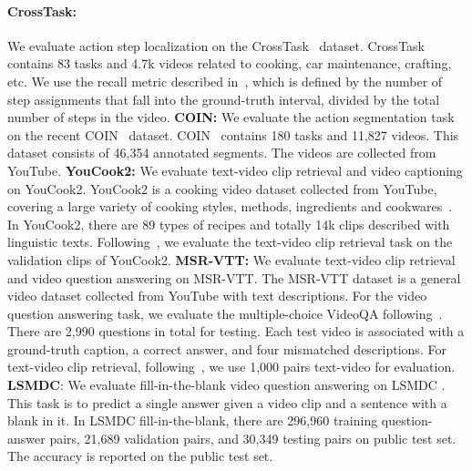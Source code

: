 \documentclass[10pt,twocolumn,letterpaper]{article}
\begin{document}
\paragraph{CrossTask:}
We evaluate action step localization on the CrossTask~\cite{zhukov2019cross} dataset.
CrossTask~\cite{zhukov2019cross} contains 83 tasks and 4.7k videos related to cooking, car maintenance,
crafting, etc. 
We use the recall metric described in~\cite{zhukov2019cross}, which is defined by the number of step assignments that fall into the ground-truth interval, divided by the total number of steps in the video.
\textbf{COIN:}
We evaluate the action segmentation task on the recent COIN~\cite{tang2019coin} dataset.
COIN~\cite{tang2019coin} contains 180 tasks and 11,827 videos. This dataset consists of 46,354 annotated segments.
The videos are collected from YouTube.
\textbf{YouCook2:} 
We evaluate text-video clip retrieval and video captioning on YouCook2.
YouCook2 is a cooking video dataset collected from YouTube, covering a large variety of cooking styles, methods, ingredients and cookwares~\cite{zhou2018towards}.
In YouCook2, there are 89 types of recipes and totally 14k clips described with linguistic texts. 
Following~\cite{miech2019howto100m}, we evaluate the text-video clip retrieval task on the validation clips of YouCook2.
\textbf{MSR-VTT:} 
We evaluate text-video clip retrieval and video question answering on MSR-VTT. The MSR-VTT dataset \cite{xu2016msr} is a general video dataset collected from YouTube with text descriptions.  
For the video question answering task, we evaluate the multiple-choice VideoQA following~\cite{yu2018joint}. There are 2,990 questions in total for testing. Each test video is associated with a ground-truth caption, a correct answer, and four mismatched descriptions.
For text-video clip retrieval, following~\cite{yu2018joint}, we use 1,000 pairs text-video for evaluation.
\textbf{LSMDC}: We evaluate fill-in-the-blank video question answering on LSMDC \cite{lsmdc}.
This task is to predict a single answer given a video clip and a sentence with a blank in it.
In LSMDC fill-in-the-blank, there are 296,960 training question-answer pairs, 21,689 validation pairs, and 30,349 testing pairs on public test set. The accuracy is reported on the public test set.
\end{document}
